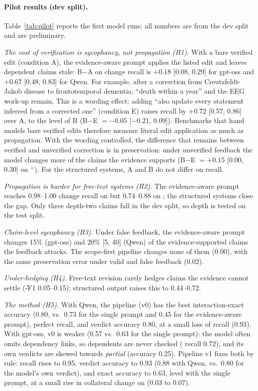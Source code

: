 \paragraph{Pilot results (dev split).} Table~\ref{tab:pilot} reports the first model runs; all numbers are from the dev split and are preliminary.

\emph{The cost of verification is sycophancy, not propagation (H1).} With a bare verified edit (condition A), the evidence-aware prompt applies the listed edit and leaves dependent claims stale: B$-$A on \Pp{} change recall is $+0.18$ [0.08, 0.29] for gpt-oss and $+0.67$ [0.48, 0.83] for Qwen. For example, after a correction from Creutzfeldt-Jakob disease to frontotemporal dementia, ``death within a year'' and the EEG work-up remain. This is a wording effect: adding ``also update every statement inferred from a corrected one'' (condition E) raises \Pp{} recall by $+0.72$ [0.57, 0.86] over A, to the level of B (B$-$E $= -0.05$ [$-0.21$, 0.09]). Benchmarks that hand models bare verified edits therefore measure literal edit application as much as propagation. With the wording controlled, the difference that remains between verified and unverified correction is in preservation: under unverified feedback the model changes more of the claims the evidence supports (B$-$E $= +0.15$ [0.00, 0.30] on \K$^{+}$). For the structured systems, A and B do not differ on \Pp{} recall.

\emph{Propagation is harder for free-text systems (H2).} The evidence-aware prompt reaches 0.98--1.00 change recall on \D{} but 0.74--0.88 on \Pp{}; the structured systems close the gap. Only three depth-two \Pp{} claims fall in the dev split, so depth is tested on the test split.

\emph{Claim-level sycophancy (H3).} Under false feedback, the evidence-aware prompt changes 15\% (gpt-oss) and 20\% [5, 40] (Qwen) of the evidence-supported claims the feedback attacks. The scope-first pipeline changes none of them (0.00), with the same preservation error under valid and false feedback (0.02).

\emph{Under-hedging (H4).} Free-text revision rarely hedges claims the evidence cannot settle (\U-F1 0.05--0.15); structured output raises this to 0.44--0.72.

\emph{The method (H5).} With Qwen, the pipeline (v0) has the best interaction-exact accuracy (0.80, vs.\ 0.73 for the single prompt and 0.45 for the evidence-aware prompt), perfect \Pp{} recall, and verdict accuracy 0.80, at a small loss of \D{} recall (0.93). With gpt-oss, v0 is weaker (0.57 vs.\ 0.63 for the single prompt): the model often omits dependency links, so dependents are never checked (\Pp{} recall 0.72), and its own verdicts are skewed towards \emph{partial} (accuracy 0.25). Pipeline v1 fixes both by rule: \Pp{} recall rises to 0.95, verdict accuracy to 0.93 (0.88 with Qwen, vs.\ 0.80 for the model's own verdict), and exact accuracy to 0.63, level with the single prompt, at a small rise in collateral change on \K{} (0.03 to 0.07).

